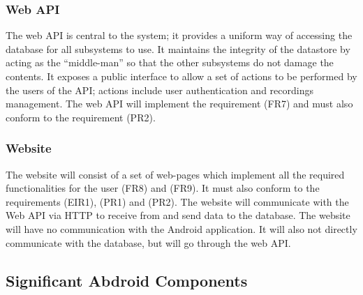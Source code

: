 	\subsubsection{Web API}
		The web API is central to the system; it provides a uniform way of accessing the database for all subsystems to use. It maintains the integrity of the datastore by acting as the ``middle-man'' so that the other subsystems do not damage the contents. It exposes a public interface to allow a set of actions to be performed by the users of the API; actions include user authentication and recordings management. The web API will implement the requirement (FR7) and must also conform to the requirement (PR2).

	\subsubsection{Website}
		The website will consist of a set of web-pages which implement all the required functionalities for the user (FR8) and (FR9). It must also conform to the requirements (EIR1), (PR1) and (PR2). The website will communicate with the Web API via HTTP to receive from and send data to the database. The website will have no communication with the Android application. It will also not directly communicate with the database, but will go through the web API. 


\subsection{Significant Abdroid Components}

